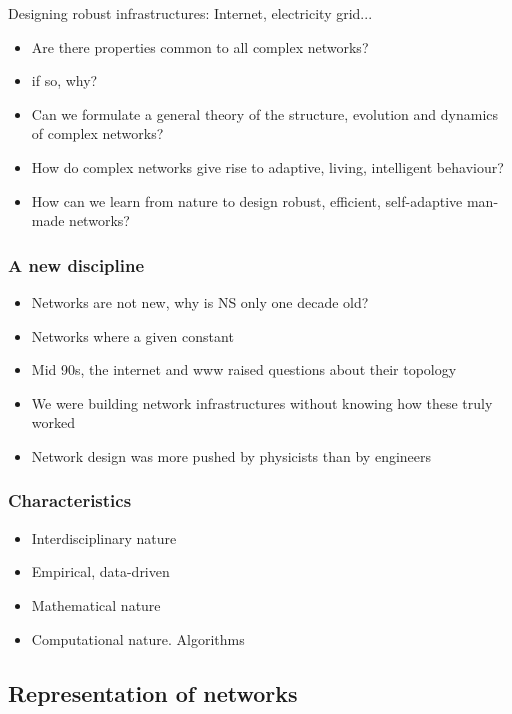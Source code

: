 Designing robust infrastructures: Internet, electricity grid...

\begin{itemize}
  \item Are there properties common to all complex networks?
  \item if so, why?
  \item Can we formulate a general theory of the structure, evolution and dynamics of complex networks?
  \item How do complex networks give rise to adaptive, living, intelligent behaviour?
  \item How can we learn from nature to design robust, efficient, self-adaptive man-made networks?
\end{itemize}

\subsubsection{A new discipline}

\begin{itemize}
  \item Networks are not new, why is NS only one decade old?
  \item Networks where a given constant
  \item Mid 90s, the internet and www raised questions about their topology
  \item We were building network infrastructures without knowing how these truly worked
  \item Network design was more pushed by physicists than by engineers
\end{itemize}

\subsubsection{Characteristics}

\begin{itemize}
  \item Interdisciplinary nature
  \item Empirical, data-driven
  \item Mathematical nature
  \item Computational nature. Algorithms
\end{itemize}

\subsection{Representation of networks}

